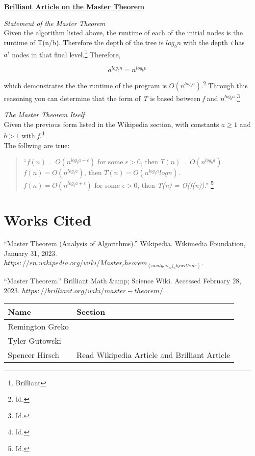 \documentclass{article}
\begin{document}
\bigskip

\noindent \textbf{\href{https://brilliant.org/wiki/master-theorem/}{Brilliant Article on the Master Theorem}}

\textit{Statement of the Master Theorem}\\

Given the algorithm listed above, the runtime of each of the initial nodes is the runtime of T(n/b). Therefore the depth of the tree 
is $log_bn$ with the depth \textit{i} has \textit{$a^i$} nodes in that final level.\footnote{Brilliant} Therefore,

\[a^{log_bn} = n^{log_bn}\]

which demonstrates the the runtime of the program is \textit{$O(n^{log_ba})$}.\footnote{Id.} Through this reasoning
you can determine that the form of \textit{T} is based between \textit{f} and \textit{$n^{log_ba}$}.\footnote{Id.}

\pagebreak

\textit{The Master Theorem Itself} \\
Given the previous form listed in the Wikipedia section, with constants \textit{$a\geq1$} and \textit{$b>1$} with \textit{f}.\footnote{Id.}\\
The follwing are true: \\
\begin{quote}
``\noindent \textit{$f(n) = O(n^{log_ba-\epsilon})$} for some $\epsilon > 0$, then \textit{$T(n) = O(n^{log_ba})$}. \\
\textit{$f(n) = O(n^{log_ba})$}, then \textit{$T(n) = O(n^{log_ba}logn)$}.\\
\textit{$f(n) = O(n^{log_ba+\epsilon})$} for some $\epsilon > 0$, then \textit{T(n) = O(f(n))}.'' \footnote{Id.}
\end{quote}

\pagebreak
\section{Works Cited}

``Master Theorem (Analysis of Algorithms).'' Wikipedia. Wikimedia Foundation, January 31, 2023. $https://en.wikipedia.org/wiki/Master_theorem_(analysis_of_algorithms)$.

``Master Theorem.'' Brilliant Math \&amp; Science Wiki. Accessed February 28, 2023. $https://brilliant.org/wiki/master-theorem/$. 

\pagebreak

\begin{center}
        \begin{tabular}{|p{3cm}|p{6cm}|}
            \hline
            \textbf{Name} & \textbf{Section} \\
            \hline
            Remington Greko & \\
            \hline
            Tyler Gutowski & \\
            \hline
            Spencer Hirsch & Read Wikipedia Article and Brilliant Article \\
            \hline
        \end{tabular}
    \end{center}
\end{document}
